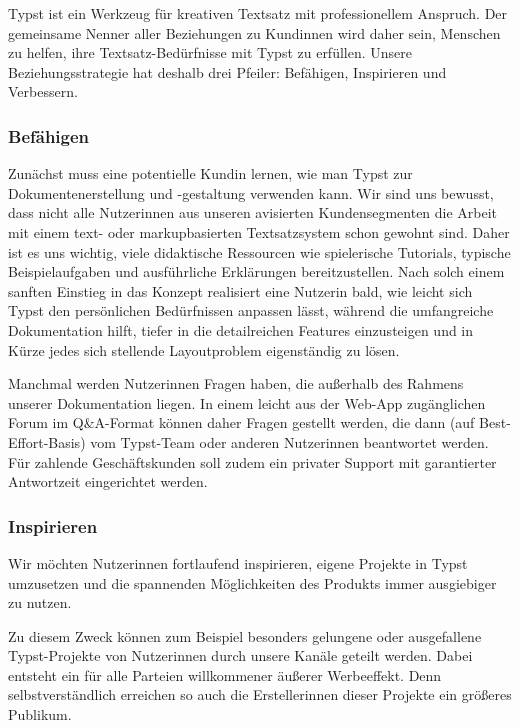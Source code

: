 \documentclass[11pt, a4paper]{article}
\newcommand{\gender}{\raisebox{-.25em}{*}}
\begin{document}
Typst ist ein Werkzeug für kreativen Textsatz mit professionellem Anspruch. Der gemeinsame Nenner aller Beziehungen zu Kund\gender{}innen wird daher sein, Menschen zu helfen, ihre Textsatz-Bedürfnisse mit Typst zu erfüllen. Unsere Beziehungsstrategie hat deshalb drei Pfeiler: Befähigen, Inspirieren und Verbessern.

\subsubsection*{Befähigen}

Zunächst muss ein\gender{}e potentielle\gender{} Kund\gender{}in lernen, wie man Typst zur Dokumentenerstellung und -gestaltung verwenden kann. Wir sind uns bewusst, dass nicht alle Nutzer\gender{}innen aus unseren avisierten Kundensegmenten die Arbeit mit einem text- oder markupbasierten Textsatzsystem schon gewohnt sind. Daher ist es uns wichtig, viele didaktische Ressourcen wie spielerische Tutorials, typische Beispielaufgaben und ausführliche Erklärungen bereitzustellen. Nach solch einem sanften Einstieg in das Konzept realisiert ein\gender{}e Nutzer\gender{}in bald, wie leicht sich Typst den persönlichen Bedürfnissen anpassen lässt, während die umfangreiche Dokumentation hilft, tiefer in die detailreichen Features einzusteigen und in Kürze jedes sich stellende Layoutproblem eigenständig zu lösen.

Manchmal werden Nutzer\gender{}innen Fragen haben, die außerhalb des Rahmens unserer Dokumentation liegen. In einem leicht aus der Web-App zugänglichen Forum im Q\&A-Format können daher Fragen gestellt werden, die dann (auf Best-Effort-Basis) vom Typst-Team oder anderen Nutzer\gender{}innen beantwortet werden. Für zahlende Geschäftskunden soll zudem ein privater Support mit garantierter Antwortzeit eingerichtet werden.

\subsubsection*{Inspirieren}

Wir möchten Nutzer\gender{}innen fortlaufend inspirieren, eigene Projekte in Typst umzusetzen und die spannenden Möglichkeiten des Produkts immer ausgiebiger zu nutzen.

Zu diesem Zweck können zum Beispiel besonders gelungene oder ausgefallene Typst-Projekte von Nutzer\gender{}innen durch unsere Kanäle geteilt werden. Dabei entsteht ein für alle Parteien willkommener äußerer Werbeeffekt. Denn selbstverständlich erreichen so auch die Ersteller\gender{}innen dieser Projekte ein größeres Publikum.
\end{document}
